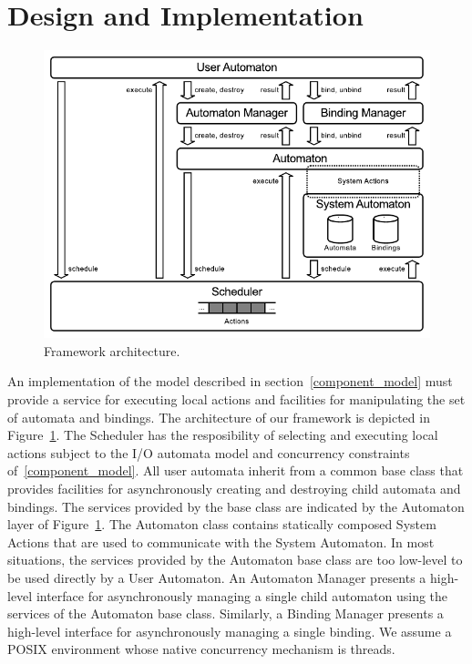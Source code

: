\section{Design and Implementation\label{design}}

\begin{figure}
\center
\includegraphics[width=\textwidth]{architecture}
\caption{Framework architecture.}
\label{framework_architecture}
\end{figure}

An implementation of the model described in section~\ref{component_model} must provide a service for executing local actions and facilities for manipulating the set of automata and bindings.
The architecture of our framework is depicted in Figure~\ref{framework_architecture}.
The Scheduler has the resposibility of selecting and executing local actions subject to the I/O automata model and concurrency constraints of~\ref{component_model}.
All user automata inherit from a common base class that provides facilities for asynchronously creating and destroying child automata and bindings.
The services provided by the base class are indicated by the Automaton layer of Figure~\ref{framework_architecture}.
The Automaton class contains statically composed System Actions that are used to communicate with the System Automaton.
In most situations, the services provided by the Automaton base class are too low-level to be used directly by a User Automaton.
An Automaton Manager presents a high-level interface for asynchronously managing a single child automaton using the services of the Automaton base class.
Similarly, a Binding Manager presents a high-level interface for asynchronously managing a single binding.
We assume a POSIX environment whose native concurrency mechanism is threads.

